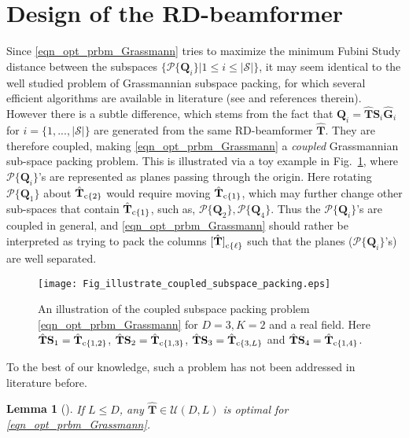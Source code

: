 \documentclass[journal,comsoc]{IEEEtran}
\newtheorem{lemma}{Lemma}[section]
\begin{document}
\section{Design of the RD-beamformer} \label{sec_pp_design}
Since \eqref{eqn_opt_prbm_Grassmann} tries to maximize the minimum Fubini Study distance between the subspaces $\{\mathcal{P}\{\mathbf{Q}_i\} | 1 \leq i \leq |\mathcal{S}|\}$, it may seem identical to the well studied problem of Grassmannian subspace packing, for which several efficient algorithms are available in literature (see \cite{Medra2014} and references therein). 
%
However there is a subtle difference, which stems from the fact that $\mathbf{Q}_i = \hat{\mathbf{T}} \mathbf{S}_i \hat{\mathbf{G}}_i $ for $i = \{1,..., |\mathcal{S}|\}$ are generated from the same RD-beamformer $\hat{\mathbf{T}}$. They are therefore coupled, making \eqref{eqn_opt_prbm_Grassmann} a \emph{coupled} Grassmannian sub-space packing problem. This is illustrated via a toy example in Fig.~\ref{Fig_illustrate_coupled_subspace}, where $\mathcal{P}\{\mathbf{Q}_i\}$'s are represented as planes passing through the origin. 
Here rotating $\mathcal{P}\{\mathbf{Q}_1\}$ about $\hat{\mathbf{T}}_{{\rm c}\{2\}}$ would require moving $\hat{\mathbf{T}}_{{\rm c}\{1\}}$, which may further change other sub-spaces that contain $\hat{\mathbf{T}}_{{\rm c}\{1\}}$, such as, $\mathcal{P}\{\mathbf{Q}_2\}, \mathcal{P}\{\mathbf{Q}_4\}$. Thus the $\mathcal{P}\{\mathbf{Q}_i\}$'s are coupled in general, and \eqref{eqn_opt_prbm_Grassmann} should rather be interpreted as trying to pack the columns ${[\hat{\mathbf{T}}]}_{{\rm c}\{\ell\}}$ such that the planes ($\mathcal{P}\{\mathbf{Q}_i\}$'s) are well separated.
%
\begin{figure}[!h]
\centering
\texttt{[image: Fig\_illustrate\_coupled\_subspace\_packing.eps]}
\caption{An illustration of the coupled subspace packing problem \eqref{eqn_opt_prbm_Grassmann} for $D=3,K=2$ and a real field. Here $\hat{\mathbf{T}}\mathbf{S}_1 = \hat{\mathbf{T}}_{{\rm c}\{1,2\}}$, $\hat{\mathbf{T}} \mathbf{S}_2 = \hat{\mathbf{T}}_{{\rm c}\{1,3\}}$, $\hat{\mathbf{T}}\mathbf{S}_3 = \hat{\mathbf{T}}_{{\rm c}\{3,L\}}$ and $\hat{\mathbf{T}}\mathbf{S}_4 = \hat{\mathbf{T}}_{{\rm c}\{1,4\}}$.}
\label{Fig_illustrate_coupled_subspace}
\end{figure}
%
To the best of our knowledge, such a problem has not been addressed in literature before. 
\begin{lemma}[] \label{Th_opt_subspace_pack}
If $L \leq D$, any $\hat{\mathbf{T}} \in \mathcal{U}(D,L)$ is optimal for \eqref{eqn_opt_prbm_Grassmann}.
\end{lemma}
\end{document}
